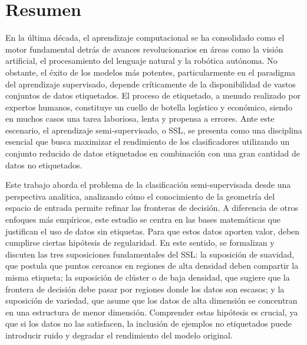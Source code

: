 \chapter*{Resumen}
\makeatletter{}\makeatother
{}

En la última década, el aprendizaje computacional se ha consolidado como el motor fundamental detrás de avances revolucionarios en áreas como la visión artificial, el procesamiento del lenguaje natural y la robótica autónoma. No obstante, el éxito de los modelos más potentes, particularmente en el paradigma del aprendizaje supervisado, depende críticamente de la disponibilidad de vastos conjuntos de datos etiquetados. El proceso de etiquetado, a menudo realizado por expertos humanos, constituye un cuello de botella logístico y económico, siendo en muchos casos una tarea laboriosa, lenta y propensa a errores. Ante este escenario, el aprendizaje semi-supervisado, o \acrfull{SSL},  se presenta como una disciplina esencial que busca maximizar el rendimiento de los clasificadores utilizando un conjunto reducido de datos etiquetados en combinación con una gran cantidad de datos no etiquetados.

Este trabajo aborda el problema de la clasificación semi-supervisada desde una perspectiva analítica, analizando cómo el conocimiento de la geometría del espacio de entrada permite refinar las fronteras de decisión. A diferencia de otros enfoques más empíricos, este estudio se centra en las bases matemáticas que justifican el uso de datos sin etiquetas. Para que estos datos aporten valor, deben cumplirse ciertas hipótesis de regularidad. En este sentido, se formalizan y discuten las tres suposiciones fundamentales del \acrshort{SSL}: la suposición de suavidad, que postula que puntos cercanos en regiones de alta densidad deben compartir la misma etiqueta; la suposición de clúster o de baja densidad, que sugiere que la frontera de decisión debe pasar por regiones donde los datos son escasos; y la suposición de variedad, que asume que los datos de alta dimensión se concentran en una estructura de menor dimensión. Comprender estas hipótesis es crucial, ya que si los datos no las satisfacen, la inclusión de ejemplos no etiquetados puede introducir ruido y degradar el rendimiento del modelo original.

